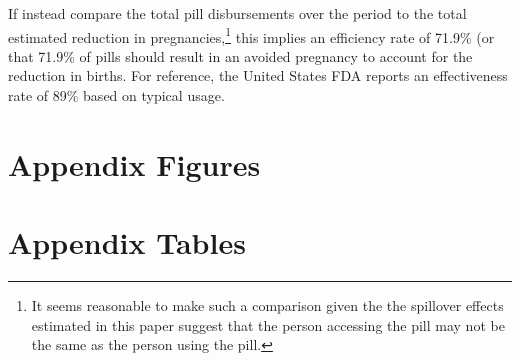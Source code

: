 If \person instead compare the total pill disbursements over the period to the 
total estimated reduction in pregnancies,\footnote{It seems reasonable to make 
such a comparison given the the spillover effects estimated in this paper suggest 
that the person accessing the pill may not be the same as the person using the 
pill.}  this implies an efficiency rate of 71.9\% (or that 71.9\% of pills should 
result in an avoided pregnancy to account for the reduction in births.  For 
reference, the United States FDA reports an effectiveness rate of 89\% based on
typical usage.

\newpage
\section{Appendix Figures}


\section{Appendix Tables}





%


